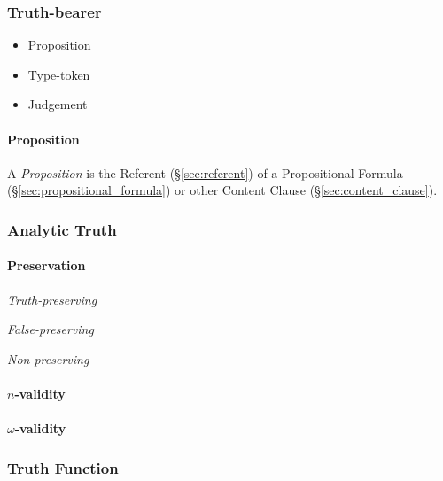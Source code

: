 \subsubsection{Truth-bearer}\label{sec:truth_bearer}

\begin{itemize}
  \item Proposition
  \item Type-token
  \item Judgement
\end{itemize}



\paragraph{Proposition}\label{sec:proposition}\hfill

A \emph{Proposition} is the Referent (\S\ref{sec:referent}) of a
Propositional Formula (\S\ref{sec:propositional_formula}) or other
Content Clause (\S\ref{sec:content_clause}).



\subsubsection{Analytic Truth}\label{sec:analytic_truth}

\paragraph{Preservation}\label{sec:preservation}\hfill

\emph{Truth-preserving}

\emph{False-preserving}

\emph{Non-preserving}



\paragraph{$n$-validity}\label{sec:n_validity}\hfill

\paragraph{$\omega$-validity}\label{sec:omega_validity}\hfill



\subsubsection{Truth Function}\label{sec:truth_function}

